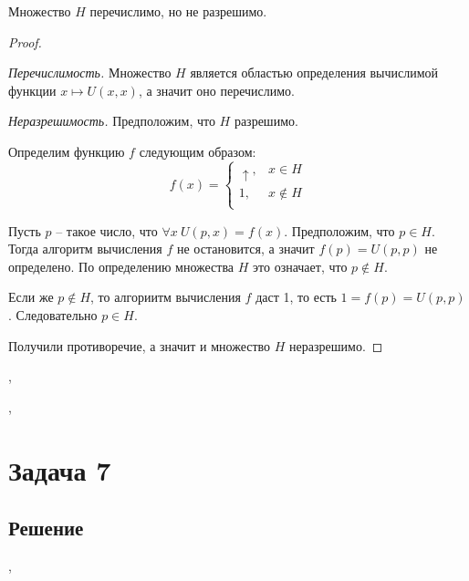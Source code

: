 \documentclass[a4paper,12pt]{article}
\begin{document}
    \begin{theorem}
        Множество $H$ перечислимо, но не разрешимо.
    \end{theorem}
    \begin{proof}
        
        \
        
        \textit{Перечислимость.} Множество $H$ является областью определения вычислимой функции $x \mapsto U(x, x)$, а значит оно перечислимо.
        
        \textit{Неразрешимость.} Предположим, что $H$ разрешимо.
        
        Определим функцию $f$ следующим образом:
        \[
        f(x) = 
        \begin{cases}
            \uparrow, & x \in H \\
            1,        & x \notin H \\
        \end{cases}
        \]
        
        Пусть $p$ -- такое число, что $\forall x \ U(p, x) = f(x)$. Предположим, что $p \in H$. Тогда алгоритм вычисления $f$ не остановится, а значит $f(p) = U(p, p)$ не определено. По определению множества $H$ это означает, что $p \notin H$.
        
        Если же $p \notin H$, то алгориитм вычисления $f$ даст 1, то есть $1 = f(p) = U(p, p)$. Следовательно $p \in H$.
        
        Получили противоречие, а значит и множество $H$ неразрешимо.
    \end{proof}
	

	\sep	
		

	


	\sep		
	
	
	
	
	\section*{Задача 7}

	
	\subsection*{Решение}
	


	\sep	
	
	
	
	
\end{document}
